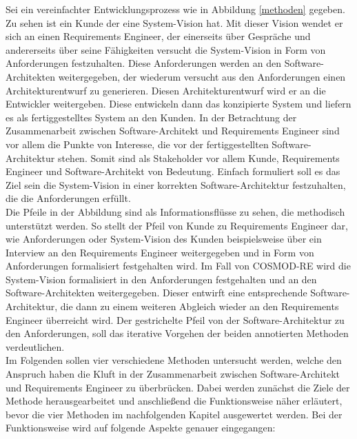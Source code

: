 Sei ein vereinfachter Entwicklungsprozess wie in Abbildung \ref{methoden} gegeben. Zu sehen ist ein Kunde der eine System-Vision hat. Mit dieser Vision wendet er sich an einen Requirements Engineer, der einerseits \"uber Gespr\"ache und andererseits \"uber seine F\"ahigkeiten versucht die System-Vision in Form von Anforderungen festzuhalten. Diese Anforderungen werden an den Software-Architekten weitergegeben, der wiederum versucht aus den Anforderungen einen Architekturentwurf zu generieren. Diesen Architekturentwurf wird er an die Entwickler weitergeben. Diese entwickeln dann das konzipierte System und liefern es als fertiggestelltes System an den Kunden. In der Betrachtung der Zusammenarbeit zwischen Software-Architekt und Requirements Engineer sind vor allem die Punkte von Interesse, die vor der fertiggestellten Software-Architektur stehen. Somit sind als Stakeholder vor allem Kunde, Requirements Engineer und Software-Architekt von Bedeutung. Einfach formuliert soll es das Ziel sein die System-Vision in einer korrekten Software-Architektur festzuhalten, die die Anforderungen erf\"ullt.\\

Die Pfeile in der Abbildung sind als Informationsfl\"usse zu sehen, die methodisch unterst\"utzt werden. So stellt der Pfeil von Kunde zu Requirements Engineer dar, wie Anforderungen oder System-Vision des Kunden beispielsweise \"uber ein Interview an den Requirements Engineer weitergegeben und in Form von Anforderungen formalisiert festgehalten wird. Im Fall von COSMOD-RE wird die System-Vision formalisiert in den Anforderungen festgehalten und an den Software-Architekten weitergegeben. Dieser entwirft eine entsprechende Software-Architektur, die dann zu einem weiteren Abgleich wieder an den Requirements Engineer \"uberreicht wird. Der gestrichelte Pfeil von der Software-Architektur zu den Anforderungen, soll das iterative Vorgehen der beiden annotierten Methoden verdeutlichen.\\

Im Folgenden sollen vier verschiedene Methoden untersucht werden, welche den Anspruch haben die Kluft in der Zusammenarbeit zwischen Software-Architekt und Requirements Engineer zu \"uberbr\"ucken. Dabei werden zun\"achst die Ziele der Methode herausgearbeitet und anschlie\ss{}end die Funktionsweise n\"aher erl\"autert, bevor die vier Methoden im nachfolgenden Kapitel ausgewertet werden. Bei der Funktionsweise wird auf folgende Aspekte genauer eingegangen: \\

